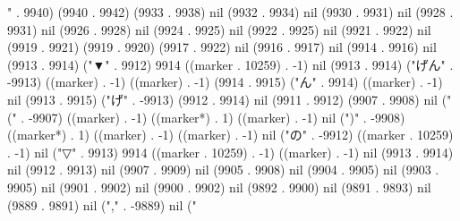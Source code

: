 {{" . 9940) (9940 . 9942) (9933 . 9938) nil (9932 . 9934) nil (9930 . 9931) nil (9928 . 9931) nil (9926 . 9928) nil (9924 . 9925) nil (9922 . 9925) nil (9921 . 9922) nil (9919 . 9921) (9919 . 9920) (9917 . 9922) nil (9916 . 9917) nil (9914 . 9916) nil (9913 . 9914) ("▼" . 9912) 9914 ((marker . 10259) . -1) nil (9913 . 9914) ("げん" . -9913) ((marker) . -1) ((marker) . -1) (9914 . 9915) ("ん" . 9914) ((marker) . -1) nil (9913 . 9915) ("げ" . -9913) (9912 . 9914) nil (9911 . 9912) (9907 . 9908) nil ("(" . -9907) ((marker) . -1) ((marker*) . 1) ((marker) . -1) nil (")" . -9908) ((marker*) . 1) ((marker) . -1) ((marker) . -1) nil ("の" . -9912) ((marker . 10259) . -1) nil ("▽" . 9913) 9914 ((marker . 10259) . -1) ((marker) . -1) nil (9913 . 9914) nil (9912 . 9913) nil (9907 . 9909) nil (9905 . 9908) nil (9904 . 9905) nil (9903 . 9905) nil (9901 . 9902) nil (9900 . 9902) nil (9892 . 9900) nil (9891 . 9893) nil (9889 . 9891) nil ("," . -9889) nil ("
}}
